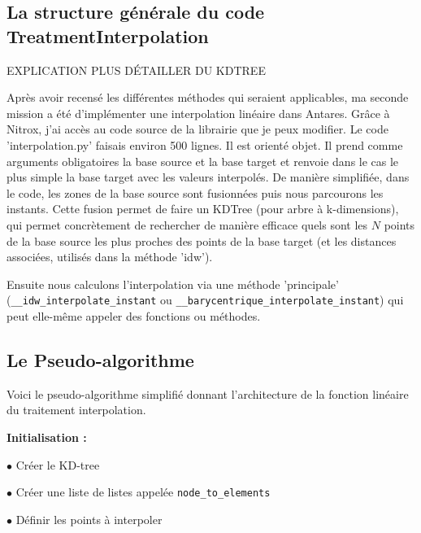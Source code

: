 \subsection{La structure générale du code TreatmentInterpolation}

EXPLICATION PLUS DÉTAILLER DU KDTREE

Après avoir recensé les différentes méthodes qui seraient applicables, ma seconde mission a été d'implémenter une interpolation linéaire dans Antares. Grâce à Nitrox, j'ai accès au code source de la librairie que je peux modifier. Le code 'interpolation.py' faisais environ 500 lignes. Il est orienté objet. Il prend comme arguments obligatoires la base source et la base target et renvoie dans le cas le plus simple la base target avec les valeurs interpolés.
De manière simplifiée, dans le code, les zones de la base source sont fusionnées puis nous parcourons les instants. 
Cette fusion permet de faire un KDTree (pour arbre à k-dimensions), qui permet concrètement de rechercher de manière efficace quels sont les \( N \) points de la base source les plus proches des points de la base target (et les distances associées, utilisés dans la méthode 'idw').

Ensuite nous calculons l'interpolation via une méthode 'principale' (\lstinline{__idw_interpolate_instant} ou
\lstinline{__barycentrique_interpolate_instant}) qui peut elle-même appeler des fonctions ou méthodes.

\subsection{Le Pseudo-algorithme}



Voici le pseudo-algorithme simplifié donnant l'architecture de la fonction linéaire du traitement interpolation.

\vspace{0.5cm}

\textbf{Initialisation :}

$\bullet$ Créer le KD-tree

$\bullet$ Créer une liste de listes appelée \texttt{node\_to\_elements}

$\bullet$ Définir les points à interpoler

\vspace{0.5cm}

